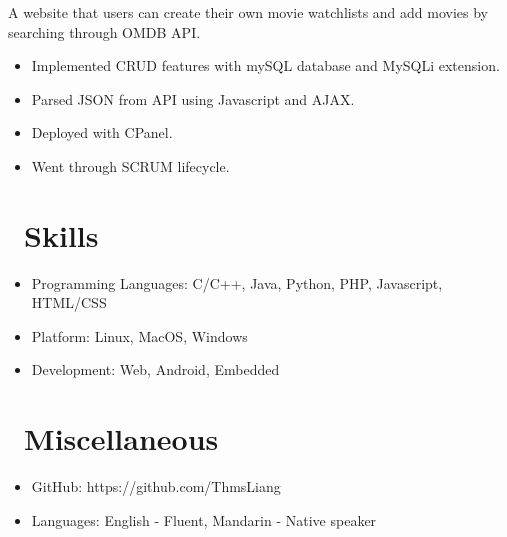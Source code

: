 \documentclass{resume}
\begin{document}
A website that users can create their own movie watchlists and add movies by searching through OMDB API.
\begin{itemize}
  \item Implemented CRUD features with mySQL database and MySQLi extension.
  \item Parsed JSON from API using Javascript and AJAX.
  \item Deployed with CPanel.
  \item Went through SCRUM lifecycle.
\end{itemize}



\section{\faCogs\ Skills}
\begin{itemize}[parsep=0.5ex]
  \item Programming Languages: C/C++, Java, Python, PHP, Javascript, HTML/CSS
  \item Platform: Linux, MacOS, Windows
  \item Development: Web, Android, Embedded
\end{itemize}

\section{\faInfo\ Miscellaneous}
\begin{itemize}[parsep=0.5ex]
  \item GitHub: https://github.com/ThmsLiang
  \item Languages: English - Fluent, Mandarin - Native speaker
\end{itemize}

%
%
\end{document}

